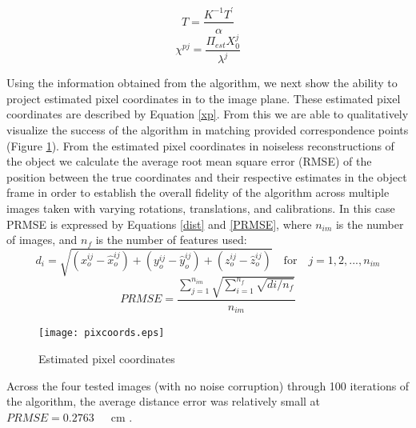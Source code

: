 \documentclass[12pt]{article}
\begin{document}
\begin{multicols}{2}
	\begin{equation}\label{Teq}
		T = \dfrac{K^{-1}T^{'}}{\alpha}
	\end{equation}\break
	\begin{equation}\label{xp}
		\chi^{pj} = \dfrac{\Pi_{est} X_0^j}{\lambda^j}
	\end{equation}\break
\end{multicols}


Using the information obtained from the algorithm, we next show the ability to project estimated pixel coordinates in to the image plane. These estimated pixel coordinates are described by Equation \ref{xp}.  From this we are able to qualitatively visualize the success of the algorithm in matching provided correspondence points (Figure \ref{pixcoords}). From the estimated pixel coordinates in noiseless reconstructions of the object we calculate the average root mean square error (RMSE) of the position between the true coordinates and their respective estimates in the object frame in order to establish the overall fidelity of the algorithm across multiple images taken with varying rotations, translations, and calibrations. In this case PRMSE is expressed by Equations \ref{dist} and \ref{PRMSE}, where $n_{im}$ is the number of images, and $n_{f} $ is the number of features used:
\begin{equation}\label{dist}
d_i = \sqrt{(x_o^{ij}-\hat{x}_o^{ij})+(y_o^{ij}-\hat{y}_o^{ij})+(z_o^{ij}-\hat{z}_o^{ij})}\quad \text{for} \quad j=1,2,...,n_{im}
\end{equation}
\begin{equation}\label{PRMSE}
	PRMSE =\dfrac{\sum_{j=1}^{n_{im}}\sqrt{\sum_{i=1}^{n_f}\sqrt{di/n_f}}}{n_{im}}
\end{equation}
\begin{figure}
	\centering %
	\texttt{[image: pixcoords.eps]}
	\caption{Estimated pixel coordinates} \label{pixcoords} 
\end{figure}
\noindent Across the four tested images (with no noise corruption) through 100 iterations of the algorithm, the average distance error was relatively small at $PRMSE = 0.2763 \quad$\ cm . 
\end{document}
